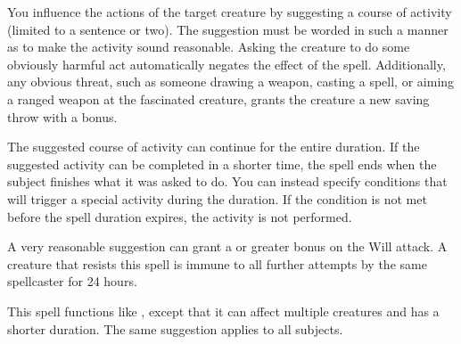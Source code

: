 \begin{spelleffect}
    You influence the actions of the target creature by suggesting a course of activity (limited to a sentence or two). The suggestion must be worded in such a manner as to make the activity sound reasonable. Asking the creature to do some obviously harmful act automatically negates the effect of the spell. Additionally, any obvious threat, such as someone drawing a weapon, casting a spell, or aiming a ranged weapon at the fascinated creature, grants the creature a new saving throw with a  bonus.
    \par The suggested course of activity can continue for the entire duration. If the suggested activity can be completed in a shorter time, the spell ends when the subject finishes what it was asked to do. You can instead specify conditions that will trigger a special activity during the duration. If the condition is not met before the spell duration expires, the activity is not performed.
\end{spelleffect}
\begin{spellnotes}
    A very reasonable suggestion can grant a  or greater bonus on the Will attack. A creature that resists this spell is immune to all further attempts by the same spellcaster for 24 hours.
\end{spellnotes}

\spelldur{\durmed}
\begin{spelleffect}
    This spell functions like , except that it can affect multiple creatures and has a shorter duration. The same suggestion applies to all subjects.
\end{spelleffect}

